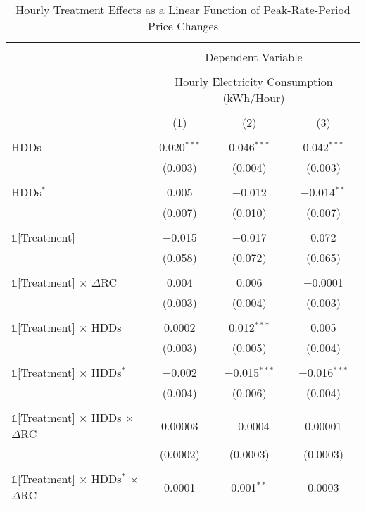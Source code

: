 
\begin{table}[!htbp] \centering 
  \caption{Hourly Treatment Effects as a Linear Function of Peak-Rate-Period Price Changes} 
  \label{Table:Hourly-ATEs-as-a-Linear-Function-of-Peak-Rate-Period-Price-Changes} 
\small 
\begin{tabular}{@{\extracolsep{95pt}}lccc} 
\\[-1.8ex]\hline 
\hline \\[-1.8ex] 
 & \multicolumn{3}{c}{Dependent Variable} \\ 
\cline{2-4} 
\\[-1.8ex] & \multicolumn{3}{c}{Hourly Electricity Consumption  (kWh/Hour)} \\ 
\\[-1.8ex] & (1) & (2) & (3)\\ 
\hline \\[-1.8ex] 
 HDDs & 0.020$^{***}$ & 0.046$^{***}$ & 0.042$^{***}$ \\ 
  & (0.003) & (0.004) & (0.003) \\ 
  & & & \\ 
 HDDs$^{*}$ & 0.005 & $-$0.012 & $-$0.014$^{**}$ \\ 
  & (0.007) & (0.010) & (0.007) \\ 
  & & & \\ 
 $\mathbb{1}$[Treatment] & $-$0.015 & $-$0.017 & 0.072 \\ 
  & (0.058) & (0.072) & (0.065) \\ 
  & & & \\ 
 $\mathbb{1}$[Treatment] $\times$ $\Delta$RC & 0.004 & 0.006 & $-$0.0001 \\ 
  & (0.003) & (0.004) & (0.003) \\ 
  & & & \\ 
 $\mathbb{1}$[Treatment] $\times$ HDDs & 0.0002 & 0.012$^{***}$ & 0.005 \\ 
  & (0.003) & (0.005) & (0.004) \\ 
  & & & \\ 
 $\mathbb{1}$[Treatment] $\times$ HDDs$^{*}$ & $-$0.002 & $-$0.015$^{***}$ & $-$0.016$^{***}$ \\ 
  & (0.004) & (0.006) & (0.004) \\ 
  & & & \\ 
 $\mathbb{1}$[Treatment] $\times$ HDDs $\times$ $\Delta$RC & 0.00003 & $-$0.0004 & 0.00001 \\ 
  & (0.0002) & (0.0003) & (0.0003) \\ 
  & & & \\ 
 $\mathbb{1}$[Treatment] $\times$ HDDs$^{*}$ $\times$ $\Delta$RC & 0.0001 & 0.001$^{**}$ & 0.0003 \\ 

\end{tabular}
\end{table}
